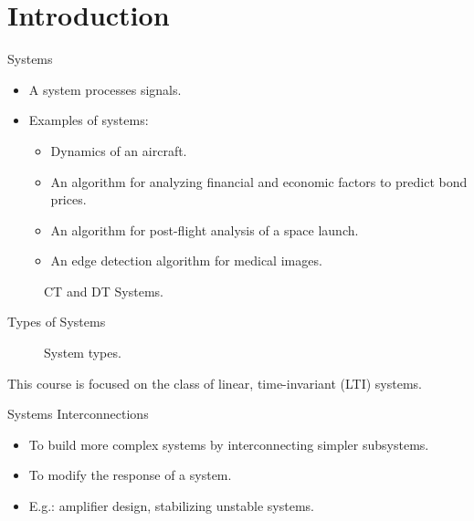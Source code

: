 \section{Introduction}
\begin{frame}{Systems}
    \begin{itemize}[<+->]
        \item A system processes signals.
        \item Examples of systems:
            \begin{itemize}
                \item Dynamics of an aircraft.
                \item An algorithm for analyzing financial and economic factors to predict bond prices.
                \item An algorithm for post-flight analysis of a space launch.
                \item An edge detection algorithm for medical images.
            \end{itemize}
    \end{itemize}

\begin{figure}
    \centering
        
        
    \caption{CT and DT Systems.}\label{fi:ct_dt_systems}
\end{figure}


\end{frame}

\begin{frame}[plain]{Types of Systems}
    \begin{figure}
        \centering
        
        \caption{System types.}\label{fi:system_types}
    \end{figure}
    This course is focused on the class of linear, time-invariant (LTI) systems.
\end{frame}


\begin{frame}{Systems Interconnections}
    \begin{itemize}
      \item To build more complex systems by interconnecting simpler subsystems.
      \item To modify the response of a system.
      \item E.g.: amplifier design, stabilizing unstable systems.
    \end{itemize}
\end{frame}

